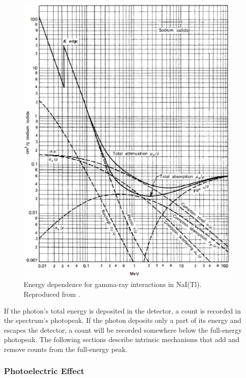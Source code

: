 \begin{figure}[H]
	\centering
	\includegraphics[width=0.75\linewidth]{images/energy_dependence_interactions}
	\caption{Energy dependence for gamma-ray interactions in NaI(Tl). Reproduced from \cite{knoll}.}
	\label{fig:energy_dependence_interactions}
\end{figure}

If the photon's total energy is deposited in the detector, a count is recorded in the spectrum's photopeak. If the photon deposits only a part of its energy and escapes the detector, a count will be recorded somewhere below the full-energy photopeak. The following sections describe intrinsic mechanisms that add and remove counts from the full-energy peak.



\subsubsection{Photoelectric Effect}

